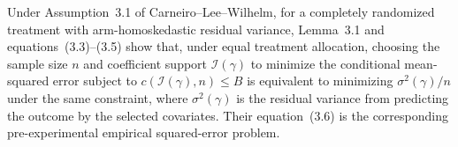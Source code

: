 Under Assumption~3.1 of Carneiro--Lee--Wilhelm, for a completely randomized treatment with arm-homoskedastic residual variance, Lemma~3.1 and equations~(3.3)--(3.5) show that, under equal treatment allocation, choosing the sample size \(n\) and coefficient support \(\mathcal I(\gamma)\) to minimize the conditional mean-squared error subject to \(c(\mathcal I(\gamma),n)\le B\) is equivalent to minimizing \(\sigma^2(\gamma)/n\) under the same constraint, where \(\sigma^2(\gamma)\) is the residual variance from predicting the outcome by the selected covariates. Their equation~(3.6) is the corresponding pre-experimental empirical squared-error problem.